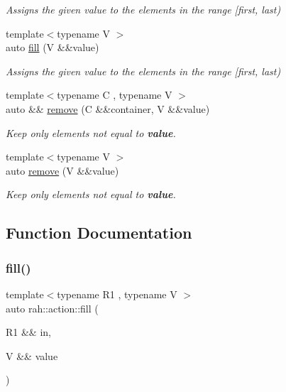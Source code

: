 \begin{DoxyCompactItemize}
\begin{DoxyCompactList}\small\item\em Assigns the given value to the elements in the range \mbox{[}first, last) \end{DoxyCompactList}\item 
{\footnotesize template$<$typename V $>$ }\\auto \mbox{\hyperlink{namespacerah_1_1action_a551824ac5386f3feb4c54ca097b76b92}{fill}} (V \&\&value)
\begin{DoxyCompactList}\small\item\em Assigns the given value to the elements in the range \mbox{[}first, last) \end{DoxyCompactList}\item 
{\footnotesize template$<$typename C , typename V $>$ }\\auto \&\& \mbox{\hyperlink{namespacerah_1_1action_a67a5825476817e46f3b0ce51259c294d}{remove}} (C \&\&container, V \&\&value)
\begin{DoxyCompactList}\small\item\em Keep only elements not equal to {\bfseries{value}}. \end{DoxyCompactList}\item 
{\footnotesize template$<$typename V $>$ }\\auto \mbox{\hyperlink{namespacerah_1_1action_abc1911e57bc7d5541f49e7662e3e44de}{remove}} (V \&\&value)
\begin{DoxyCompactList}\small\item\em Keep only elements not equal to {\bfseries{value}}. \end{DoxyCompactList}\end{DoxyCompactItemize}


\subsection{Function Documentation}
\mbox{\label{namespacerah_1_1action_afee3c0ce8604f13a4e8a6f1975d335f6}} 
\subsubsection{\texorpdfstring{fill()}{fill()}\hspace{0.1cm}{\footnotesize\ttfamily [1/2]}}
{\footnotesize\ttfamily template$<$typename R1 , typename V $>$ \\
auto rah\+::action\+::fill (\begin{DoxyParamCaption}\item[{R1 \&\&}]{in,  }\item[{V \&\&}]{value }\end{DoxyParamCaption})}



